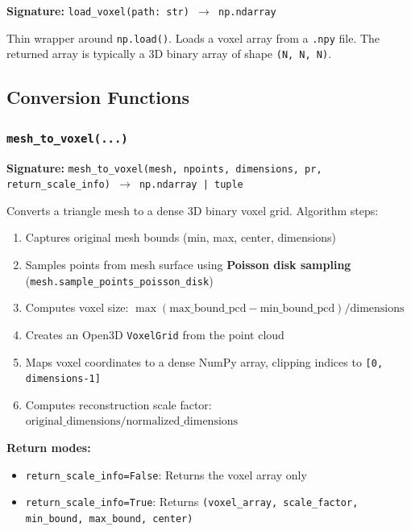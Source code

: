 \documentclass[12pt,a4paper]{article}
\begin{document}
\textbf{Signature:} \texttt{load\_voxel(path: str) $\rightarrow$ np.ndarray}

Thin wrapper around \texttt{np.load()}. Loads a voxel array from a \texttt{.npy} file. The returned array is typically a 3D binary array of shape \texttt{(N, N, N)}.

\subsection{Conversion Functions}

\subsubsection{\texttt{mesh\_to\_voxel(...)}}

\textbf{Signature:} \texttt{mesh\_to\_voxel(mesh, npoints, dimensions, pr, return\_scale\_info) $\rightarrow$ np.ndarray | tuple}

Converts a triangle mesh to a dense 3D binary voxel grid. Algorithm steps:

\begin{enumerate}
  \item Captures original mesh bounds (min, max, center, dimensions)
  \item Samples points from mesh surface using \textbf{Poisson disk sampling} (\texttt{mesh.sample\_points\_poisson\_disk})
  \item Computes voxel size: $\max(\text{max\_bound\_pcd} - \text{min\_bound\_pcd}) / \text{dimensions}$
  \item Creates an Open3D \texttt{VoxelGrid} from the point cloud
  \item Maps voxel coordinates to a dense NumPy array, clipping indices to \texttt{[0, dimensions-1]}
  \item Computes reconstruction scale factor: $\text{original\_dimensions} / \text{normalized\_dimensions}$
\end{enumerate}

\textbf{Return modes:}
\begin{itemize}
  \item \texttt{return\_scale\_info=False}: Returns the voxel array only
  \item \texttt{return\_scale\_info=True}: Returns \texttt{(voxel\_array, scale\_factor, min\_bound, max\_bound, center)}
\end{itemize}
\end{document}
